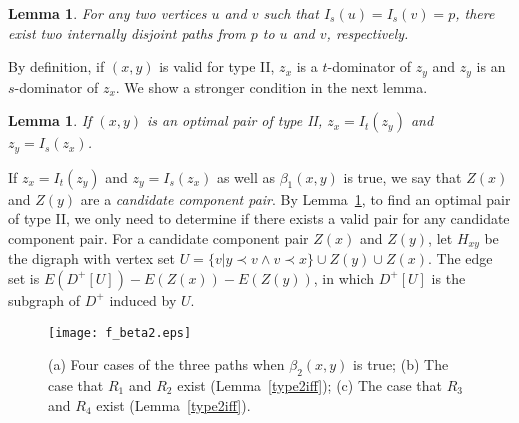 \documentclass[review]{elsarticle}
\def\squarebox#1{\hbox to #1{\hfill\vbox to #1{\vfill}}}
\renewcommand{\qed}{\hspace*{\fill}
            \vbox{\hrule\hbox{\vrule\squarebox{.667em}\vrule}\hrule}\smallskip\newline}
\newtheorem{lem}[thm]{Lemma}
\begin{document}
\begin{lem}\label{2p1to2}
For any two vertices $u$ and $v$ such that $I_s(u)=I_s(v)=p$, there
exist two internally disjoint paths from $p$ to $u$ and $v$,
respectively.
\end{lem}

By definition, if $(x,y)$ is valid for type II, $z_x$ is a
$t$-dominator of $z_y$ and $z_y$ is an $s$-dominator of $z_x$. We
show a stronger condition in the next lemma.


\begin{lem}\label{type2b}
If $(x,y)$ is an optimal pair of type II, $z_x=I_t(z_y)$ and
$z_y=I_s(z_x)$.
\end{lem}

If $z_x=I_t(z_y)$ and $z_y=I_s(z_x)$ as well as $\beta_1(x,y)$ is
true, we say that $Z(x)$ and $Z(y)$ are a {\em candidate component
pair}. By Lemma~\ref{type2b}, to find an optimal pair of type II, we
only need to determine if there exists a valid pair for any
candidate component pair. For a candidate component pair $Z(x)$ and
$Z(y)$, let $H_{xy}$ be the digraph with vertex set $U=\{v|y\prec
v\wedge v\prec x\}\cup Z(y)\cup Z(x)$. The edge set is
$E(D^+[U])-E(Z(x))-E(Z(y))$, in which $D^+[U]$ is the subgraph of
$D^+$ induced by $U$.

\begin{figure}[t]
\begin{center}
\texttt{[image: f\_beta2.eps]}
\caption{{\rm (a)} Four cases of the three paths when $\beta_2(x,y)$ is true; {\rm (b)} The case that $R_1$ and $R_2$ exist ({\rm Lemma~\ref{type2iff}}); {\rm (c)} The case that $R_3$ and $R_4$ exist {\rm (Lemma~\ref{type2iff})}.}
\label{fbeta}
\end{center}
\end{figure}
\end{document}
